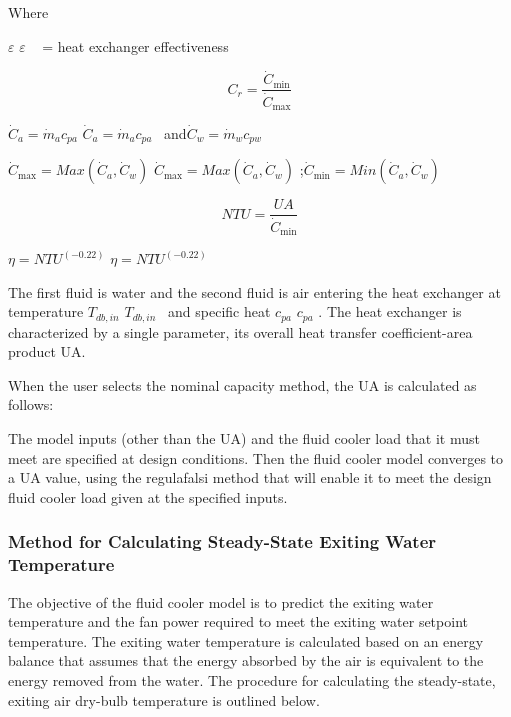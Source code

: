 Where

\(\varepsilon\) \(\varepsilon\) \emph{~} = heat exchanger effectiveness

\begin{equation}
{C_r} = \frac{{{{\dot C}_{\min }}}}{{{{\dot C}_{\max }}}}
\end{equation}

\({\dot C_a} = {\dot m_a}{c_{pa}}\) \({\dot C_a} = {\dot m_a}{c_{pa}}\) ~and\({\dot C_w} = {\dot m_w}{c_{pw}}\)

\({\dot C_{\max }} = Max({\dot C_a},{\dot C_w})\) \({\dot C_{\max }} = Max({\dot C_a},{\dot C_w})\) ;\({\dot C_{\min }} = Min({\dot C_a},{\dot C_w})\)

\begin{equation}
NTU = \frac{{UA}}{{{{\dot C}_{\min }}}}
\end{equation}

\(\eta = NT{U^{( - 0.22)}}\) \(\eta = NT{U^{( - 0.22)}}\)

The first fluid is water and the second fluid is air entering the heat exchanger at temperature \({T_{db,in}}\) \({T_{db,in}}\) ~and specific heat \({c_{pa}}\) \({c_{pa}}\) . The heat exchanger is characterized by a single parameter, its overall heat transfer coefficient-area product UA.

When the user selects the nominal capacity method, the UA is calculated as follows:

The model inputs (other than the UA) and the fluid cooler load that it must meet are specified at design conditions. Then the fluid cooler model converges to a UA value, using the regulafalsi method that will enable it to meet the design fluid cooler load given at the specified inputs.

\subsubsection{Method for Calculating Steady-State Exiting Water Temperature}\label{method-for-calculating-steady-state-exiting-water-temperature-1}

The objective of the fluid cooler model is to predict the exiting water temperature and the fan power required to meet the exiting water setpoint temperature. The exiting water temperature is calculated based on an energy balance that assumes that the energy absorbed by the air is equivalent to the energy removed from the water. The procedure for calculating the steady-state, exiting air dry-bulb temperature is outlined below.

